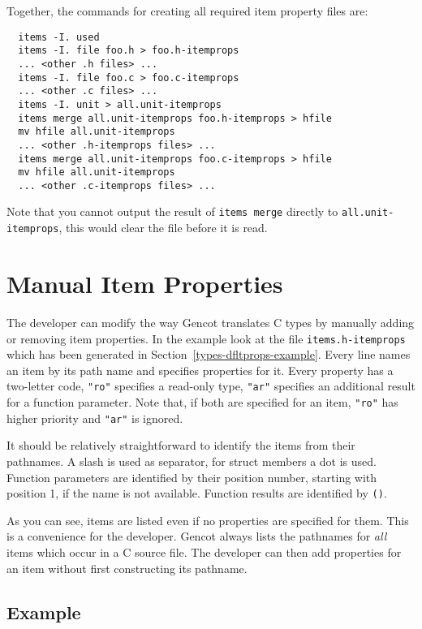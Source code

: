 \documentclass[a4paper]{report}
\newcommand{\code}[1]{\textnormal{\texttt{#1}}}
\begin{document}
Together, the commands for creating all required item property files are:
\begin{verbatim}
  items -I. used
  items -I. file foo.h > foo.h-itemprops
  ... <other .h files> ...
  items -I. file foo.c > foo.c-itemprops
  ... <other .c files> ...
  items -I. unit > all.unit-itemprops
  items merge all.unit-itemprops foo.h-itemprops > hfile
  mv hfile all.unit-itemprops
  ... <other .h-itemprops files> ...
  items merge all.unit-itemprops foo.c-itemprops > hfile
  mv hfile all.unit-itemprops  
  ... <other .c-itemprops files> ...
\end{verbatim}
Note that you cannot output the result of \code{items merge} directly to \code{all.unit-itemprops},
this would clear the file before it is read.

\section{Manual Item Properties}
\label{types-manprops}

The developer can modify the way Gencot translates C types by manually adding or removing item properties. In the example
look at the file \code{items.h-itemprops} which has been generated in Section~\ref{types-dfltprops-example}. Every line
names an item by its path name and specifies properties for it. Every property has a two-letter code, \code{"ro"} specifies
a read-only type, \code{"ar"} specifies an additional result for a function parameter. Note that, if both are specified 
for an item, \code{"ro"} has higher priority and \code{"ar"} is ignored.

It should be relatively straightforward to identify the items from their pathnames. A slash is used as separator, for struct 
members a dot is used. Function parameters are identified by their position number, starting with position 1, if the name
is not available. Function results are identified by \code{()}.

As you can see, items are listed even if no properties are specified for them. This is a convenience for the developer. Gencot
always lists the pathnames for \textit{all} items which occur in a C source file. The developer can then add properties for
an item without first constructing its pathname.

\subsection{Example}
\label{types-manprops-example}
\end{document}
